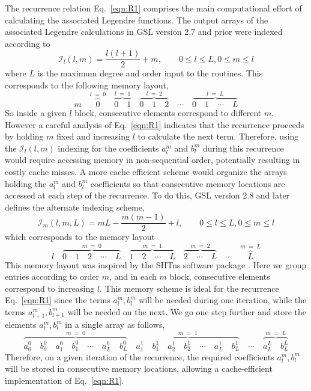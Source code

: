 \documentclass[12pt]{article}
\begin{document}
The recurrence relation Eq.~\eqref{eqn:R1} comprises the main computational effort of calculating
the associated Legendre functions.  The output arrays of the associated Legendre calculations in GSL
version 2.7 and prior were indexed according to
\begin{equation}
\mathcal{I}_l(l,m) = \frac{l(l+1)}{2} + m, \qquad 0 \leq l \leq L, 0 \leq m \leq l
\end{equation}
where $L$ is the maximum degree and order input to the routines. This corresponds to
the following memory layout,
$$
m \quad \overbrace{0}^{l \; = \; 0} \quad \overbrace{0 \quad 1}^{l \; = \; 1} \quad \overbrace{0 \quad 1 \quad 2}^{l \; = \; 2} \quad \cdots \quad \overbrace{0 \quad 1 \quad \cdots \quad L}^{l \; = \; L}
$$
So inside a given $l$ block, consecutive elements correspond to different $m$. However a careful analysis
of Eq.~\eqref{eqn:R1} indicates that the recurrence proceeds by holding $m$ fixed and increasing $l$ to
calculate the next term. Therefore, using the $\mathcal{I}_l(l,m)$ indexing for the coefficients $a_l^m$
and $b_l^m$ during this recurrence would require accessing memory in non-sequential order, potentially resulting
in costly cache misses. A more cache efficient scheme would organize the arrays holding the $a_l^m$ and $b_l^m$
coefficients so that consecutive memory locations are accessed at each step of the recurrence. To do this,
GSL version 2.8 and later defines the alternate indexing scheme,
\begin{equation}
\mathcal{I}_m(l,m,L) = m L - \frac{m(m-1)}{2} + l, \qquad 0 \leq l \leq L, 0 \leq m \leq l
\end{equation}
which corresponds to the memory layout
$$
l \quad \overbrace{0 \quad 1 \quad 2 \quad \cdots \quad L}^{m \; = \; 0} \quad \overbrace{1 \quad 2 \quad \cdots \quad L}^{m \; = \; 1} \quad \overbrace{2 \quad \cdots \quad L}^{m \; = \; 2} \quad \cdots \quad \overbrace{L}^{m \; = \; L}
$$
This memory layout was inspired by the SHTns software package
\citep{schaeffer2013}.
Here we group entries according to order $m$, and in each $m$ block, consecutive elements correspond to increasing $l$.
This memory scheme is ideal for the recurrence Eq.~\eqref{eqn:R1} since the terms $a_l^m,b_l^m$ will be needed
during one iteration, while the terms $a_{l+1}^m,b_{l+1}^m$ will be needed on the next. We go one step further and
store the elements $a_l^m,b_l^m$ in a single array as follows,
$$
\overbrace{a_0^0 \quad b_0^0 \quad a_1^0 \quad b_1^0 \quad \cdots \quad a_L^0 \quad b_L^0}^{m \; = \; 0} \quad \overbrace{a_1^1 \quad b_1^1 \quad a_2^1 \quad b_2^1 \quad \cdots \quad a_L^1 \quad b_L^1}^{m \; = \; 1} \quad \cdots \quad \overbrace{a_L^L \quad b_L^L}^{m \; = \; L}
$$
Therefore, on a given iteration of the recurrence, the required coefficients $a_l^m,b_l^m$ will be stored in
consecutive memory locations, allowing a cache-efficient implementation of Eq.~\eqref{eqn:R1}.
\end{document}
